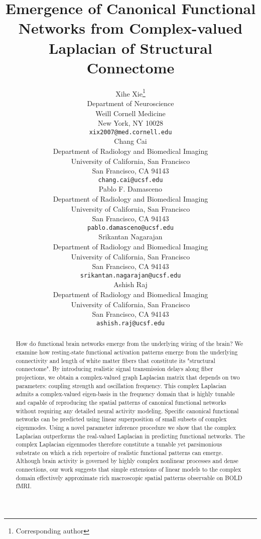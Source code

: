 \documentclass{article}
\title{Emergence of Canonical Functional Networks from Complex-valued Laplacian of Structural Connectome}
\author{
  Xihe Xie\thanks{Corresponding author} \\
  Department of Neuroscience\\
  Weill Cornell Medicine\\
  New York, NY 10028 \\
  \texttt{xix2007@med.cornell.edu} \\
   \And
  Chang Cai \\
  Department of Radiology and Biomedical Imaging\\
  University of California, San Francisco\\
  San Francisco, CA 94143\\
  \texttt{chang.cai@ucsf.edu} \\
   \And
  Pablo F. Damasceno \\
  Department of Radiology and Biomedical Imaging\\
  University of California, San Francisco\\
  San Francisco, CA 94143\\
  \texttt{pablo.damasceno@ucsf.edu}\\
  \And
  Srikantan Nagarajan \\
  Department of Radiology and Biomedical Imaging\\
  University of California, San Francisco\\
  San Francisco, CA 94143\\
  \texttt{srikantan.nagarajan@ucsf.edu} \\
  \And
  Ashish Raj \\
  Department of Radiology and Biomedical Imaging\\
  University of California, San Francisco\\
  San Francisco, CA 94143\\
  \texttt{ashish.raj@ucsf.edu} \\
}
\begin{document}
\maketitle

\begin{abstract}

How do functional brain networks emerge from the underlying wiring of the brain? We examine how resting-state functional activation patterns emerge from the underlying connectivity and length of white matter fibers that constitute its "structural connectome". By introducing realistic signal transmission delays along fiber projections, we obtain a complex-valued graph Laplacian matrix that depends on two parameters: coupling strength and oscillation frequency. This complex Laplacian admits a complex-valued eigen-basis in the frequency domain that is highly tunable and capable of reproducing the spatial patterns of canonical functional networks without requiring any detailed neural activity modeling. Specific canonical functional networks can be predicted using linear superposition of small subsets of complex eigenmodes. Using a novel parameter inference procedure we show that the complex Laplacian outperforms the real-valued Laplacian in predicting functional networks. The complex Laplacian eigenmodes therefore constitute a tunable yet parsimonious substrate on which a rich repertoire of realistic functional patterns can emerge. Although brain activity is governed by highly complex nonlinear processes and dense connections, our work suggests that simple extensions of linear models to the complex domain effectively approximate rich macroscopic spatial patterns observable on BOLD fMRI.


\end{abstract}

\end{document}
